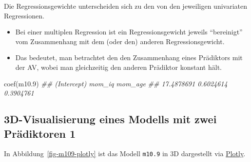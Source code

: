 \documentclass[
  a4paper,
  DIV=11]{scrreprt}
\newenvironment{Shaded}{\begin{snugshade}}{\end{snugshade}}
\newcommand{\DocumentationTok}[1]{\textcolor[rgb]{0.37,0.37,0.37}{\textit{#1}}}
\newcommand{\FloatTok}[1]{\textcolor[rgb]{0.68,0.00,0.00}{#1}}
\newcommand{\FunctionTok}[1]{\textcolor[rgb]{0.28,0.35,0.67}{#1}}
\newcommand{\NormalTok}[1]{\textcolor[rgb]{0.00,0.23,0.31}{#1}}
\providecommand{\tightlist}{%
  \setlength{\itemsep}{0pt}\setlength{\parskip}{0pt}}\usepackage{longtable,booktabs,array}
\theoremstyle{definition}
\theoremstyle{remark}
\begin{document}
\begin{tcolorbox}[enhanced jigsaw, leftrule=.75mm, toptitle=1mm, bottomtitle=1mm, titlerule=0mm, breakable, colframe=quarto-callout-important-color-frame, title=\textcolor{quarto-callout-important-color}{\faExclamation}\hspace{0.5em}{Wichtig}, rightrule=.15mm, colback=white, arc=.35mm, left=2mm, bottomrule=.15mm, coltitle=black, opacitybacktitle=0.6, toprule=.15mm, colbacktitle=quarto-callout-important-color!10!white, opacityback=0]
Die Regressionsgewichte unterscheiden sich zu den von den jeweiligen
univariaten Regressionen.
\end{tcolorbox}

\begin{itemize}
\tightlist
\item
  Bei einer multiplen Regression ist ein Regressionsgewicht jeweils
  ``bereinigt'' vom Zusammenhang mit dem (oder den) anderen
  Regressionsgewicht.
\item
  Das bedeutet, man betrachtet den den Zusammenhang eines Prädiktors mit
  der AV, wobei man gleichzeitig den anderen Prädiktor konstant hält.
\end{itemize}

\begin{Shaded}
\begin{Highlighting}[]
\FunctionTok{coef}\NormalTok{(m10}\FloatTok{.9}\NormalTok{)}
\DocumentationTok{\#\# (Intercept)      mom\_iq     mom\_age }
\DocumentationTok{\#\#  17.4878691   0.6024614   0.3904761}
\end{Highlighting}
\end{Shaded}

\hypertarget{d-visualisierung-eines-modells-mit-zwei-pruxe4diktoren-1}{%
\subsection{3D-Visualisierung eines Modells mit zwei Prädiktoren
1}\label{d-visualisierung-eines-modells-mit-zwei-pruxe4diktoren-1}}

In Abbildung~\ref{fig-m109-plotly} ist das Modell \texttt{m10.9} in 3D
dargestellt via \href{https://plotly.com/r/}{Plotly}.
\end{document}
